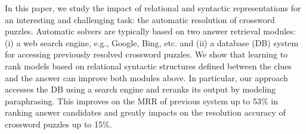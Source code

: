 In this paper, we study the impact of relational and syntactic representations for an interesting and challenging task: the automatic resolution of crossword puzzles. Automatic solvers are typically based on two answer retrieval modules: (i) a web search engine, e.g., Google, Bing, etc. and (ii) a database (DB) system for accessing previously resolved crossword puzzles. We show that learning to rank models based on relational syntactic structures defined between the clues and the answer can improve both modules above. In particular, our approach accesses the DB using a search engine and reranks its output by modeling paraphrasing. This improves on the MRR of previous system up to 53\% in ranking answer candidates and greatly impacts on the resolution accuracy of crossword puzzles up to 15\%.
